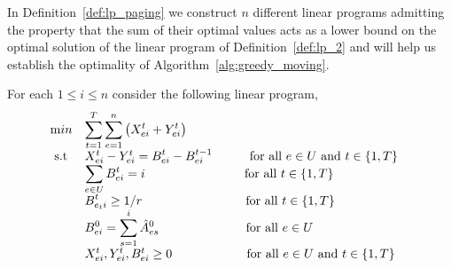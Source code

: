 \noindent In Definition~\ref{def:lp_paging} we construct $n$ different linear programs admitting the property that the sum of their optimal values acts as a lower bound on the optimal solution of the linear program of Definition~\ref{def:lp_2} and will help us establish the optimality of Algorithm~\ref{alg:greedy_moving}. 
\begin{definition}\label{def:lp_paging}
For each $1\leq i \leq n$ consider the following linear program,
\begin{equation*}
    \begin{array}{ll@{}ll}
        \text min & \displaystyle \sum_{t=1}^T\sum_{e = 1}^{n} \left(X_{ei}^t + Y_{ei}^t\right) &\\
        \text{ s.t } & X_{ei}^t - Y_{ei}^t = \displaystyle B_{ei}^t - B_{ei}^{t-1}~~~~~~~~~\text{for all }e\in U \text{ and } t \in \{1,T\} &&\\
        & \displaystyle \sum_{e \in U} B_{ei}^t = i ~~~~~~~~~~~~~~~~~~~~~~~~\text{for all }t \in \{1,T\}
        &\\
        & \displaystyle B_{e_t i}^t \geq 1/r ~~~~~~~~~~~~~~~~~~~~~~~~~\text{for all }t \in \{1,T\}&\\
        & \displaystyle B_{e i}^0 = \sum_{s=1}^i \hat{A}^0_{es}~~~~~~~~~~~~~~~~~~~~~\text{for all }e \in U&\\
        & X_{ei}^t,Y_{ei}^t, B_{ei}^t \geq 0~~~~~~~~~~~~~~~~~~\text{for all }e \in U \text{ and }t \in \{1,T\}&\\
    \end{array}
\end{equation*}
\end{definition}

